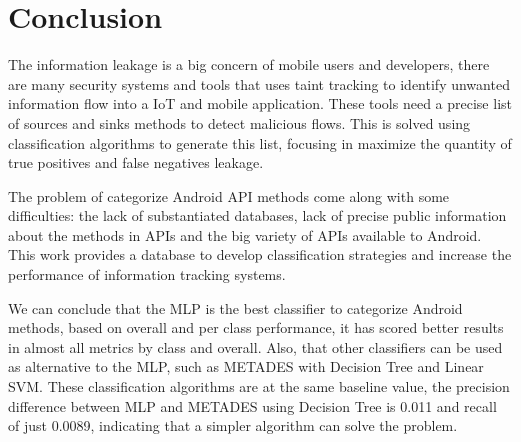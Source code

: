\chapter{Conclusion}\label{chapter:conclusion}

The information leakage is a big concern of mobile users and developers, there are many security systems and tools that uses taint tracking to identify unwanted information flow into a IoT and mobile application. These tools need a precise list of sources and sinks methods to detect malicious flows. This is solved using classification algorithms to generate this list, focusing in maximize the quantity of true positives and false negatives leakage.

The problem of categorize Android API methods come along with some difficulties: the lack of substantiated databases, lack of precise public information about the methods in APIs and the big variety of APIs available to Android. This work provides a database to develop classification strategies and increase the performance of information tracking systems.

We can conclude that the MLP is the best classifier to categorize Android methods, based on overall and per class performance, it has scored better results in almost all metrics by class and overall. Also, that other classifiers can be used as alternative to the MLP, such as METADES with Decision Tree and Linear SVM. These classification algorithms are at the same baseline value, the precision difference between MLP and METADES using Decision Tree is 0.011 and recall of just 0.0089, indicating that a simpler algorithm can solve the problem.
